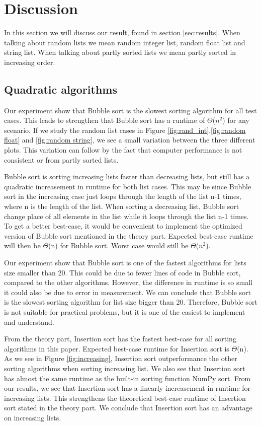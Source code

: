 \documentclass[sigconf, nonacm, natbib, screen, balance=False]{acmart}
\begin{document}
\section{Discussion}\label{sec:discussion}
In this section we will discuss our result, found in section \ref{sec:results}.
When talking about random lists we mean random integer list, random float list and string list. When talking about partly sorted lists we mean partly sorted in increasing order.
\subsection{Quadratic algorithms }

Our experiment show that Bubble sort is the slowest sorting algorithm for all test cases. This leads to strengthen that Bubble sort has a runtime of $\Theta$($n^2$) for any scenario. If we study the random list cases in Figure \ref{fig:rand_int},\ref{fig:random float} and \ref{fig:random string}, we see a small variation between the three different plots. This variation can follow by the fact that computer performance is not consistent or from partly sorted lists.

Bubble sort is sorting increasing lists faster than decreasing lists, but still has a quadratic increasement in runtime for both list cases. This may be since Bubble sort in the increasing case just loops through the length of the list n-1 times, where n is the length of the list. When sorting a decreasing list, Bubble sort change place of all elements in the list while it loops through the list n-1 times. To get a better best-case, it would be convenient to implement the optimized version of Bubble sort mentioned in the theory part. Expected best-case runtime will then be $\Theta$(n) for Bubble sort. Worst case would still be $\Theta$($n^2$).

Our experiment show that Bubble sort is one of the fastest algorithms for lists size smaller than 20. This could be due to fewer lines of code in Bubble sort, compared to the other algorithms. However, the difference in runtime is so small it could also be due to error in measurement. We can conclude that Bubble sort is the slowest sorting algorithm for list size bigger than 20. Therefore, Bubble sort is not suitable for practical problems, but it is one of the easiest to implement and understand. 

From the theory part, Insertion sort has the fastest best-case for all sorting algorithms in this paper. Expected best-case runtime for Insertion sort is $\Theta$(n). As we see in Figure \ref{fig:increasing}, Insertion sort outperformance the other sorting algorithms when sorting increasing list. We also see that Insertion sort has almost the same runtime as the built-in sorting function NumPy sort. From our results, we see that Insertion sort has a linearly increasement in runtime for increasing lists. This strengthens the theoretical best-case runtime of Insertion sort stated in the theory part. We conclude that Insertion sort has an advantage on increasing lists.
\end{document}
